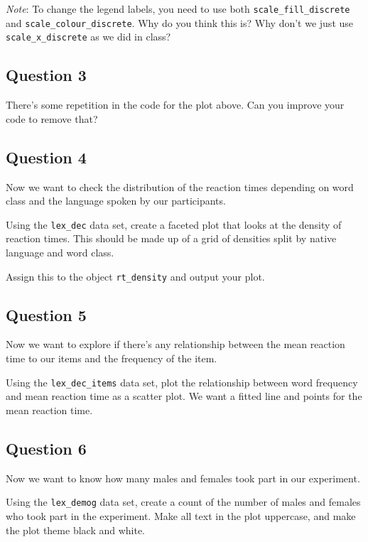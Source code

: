 \documentclass[
]{book}
\begin{document}
\emph{Note}: To change the legend labels, you need to use both \texttt{scale\_fill\_discrete} and \texttt{scale\_colour\_discrete}. Why do you think this is? Why don't we just use \texttt{scale\_x\_discrete} as we did in class?

\hypertarget{question-3-2}{%
\subsection{Question 3}\label{question-3-2}}

There's some repetition in the code for the plot above. Can you improve your code to remove that?

\hypertarget{question-4-2}{%
\subsection{Question 4}\label{question-4-2}}

Now we want to check the distribution of the reaction times depending on word class and the language spoken by our participants.

Using the \texttt{lex\_dec} data set, create a faceted plot that looks at the density of reaction times. This should be made up of a grid of densities split by native language and word class.

Assign this to the object \texttt{rt\_density} and output your plot.

\hypertarget{question-5-2}{%
\subsection{Question 5}\label{question-5-2}}

Now we want to explore if there's any relationship between the mean reaction time to our items and the frequency of the item.

Using the \texttt{lex\_dec\_items} data set, plot the relationship between word frequency and mean reaction time as a scatter plot. We want a fitted line and points for the mean reaction time.

\hypertarget{question-6-2}{%
\subsection{Question 6}\label{question-6-2}}

Now we want to know how many males and females took part in our experiment.

Using the \texttt{lex\_demog} data set, create a count of the number of males and females who took part in the experiment. Make all text in the plot uppercase, and make the plot theme black and white.
\end{document}
